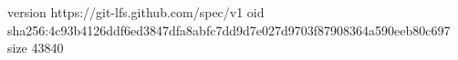 version https://git-lfs.github.com/spec/v1
oid sha256:4c93b4126ddf6ed3847dfa8abfc7dd9d7e027d9703f87908364a590eeb80c697
size 43840
